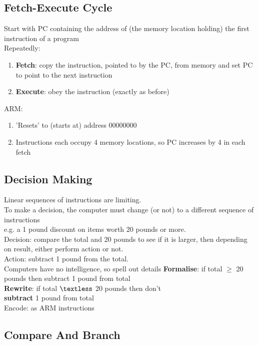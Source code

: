\documentclass{article}
\begin{document}
\subsection{Fetch-Execute Cycle}
Start with PC containing the address of (the memory location holding) the first instruction of a program\\
Repeatedly:
\begin{enumerate}
\item \textbf{Fetch}: copy the instruction, pointed to by the PC, from memory and set PC to point to the next instruction
\item \textbf{Execute}:  obey the instruction (exactly as before)
\end{enumerate}
ARM:
\begin{enumerate}
\item 'Resets' to (starts at) address 00000000
\item Instructions each occupy 4 memory locations, so PC increases by 4 in each fetch
\end{enumerate}
\subsection{Decision Making}
Linear sequences of instructions are limiting.\\
To make a decision, the computer must change (or not) to a
different sequence of instructions\\
e.g. a 1 pound discount on items worth 20 pounds or more.\\
Decision: compare the total and 20 pounds to see if it is larger,
then depending on result, either perform action or not.\\
Action: subtract 1 pound from the total.\\
Computers have no intelligence, so spell out details
\textbf{Formalise}: if total \(\geq\) 20 pounds then subtract 1 pound from total\\
\textbf{Rewrite}: if total \(\textless\) 20 pounds then don’t\\
\textbf{subtract} 1 pound from total\\
Encode: as ARM instructions
\subsection{Compare And Branch}
\end{document}
